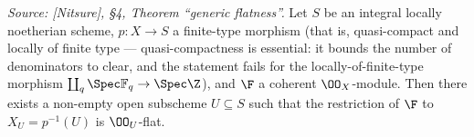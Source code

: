 \begin{theorem}
  \leanok
  \label{thm:generic_flatness}
  \textit{Source: [Nitsure], \S4, Theorem ``generic flatness''.}
  Let \(S\) be an integral locally noetherian scheme, \(p : X \to S\) a
  finite-type morphism (that is, quasi-compact and locally of finite type —
  quasi-compactness is essential: it bounds the number of denominators to
  clear, and the statement fails for the locally-of-finite-type morphism
  \(\coprod_q \Spec \mathbb{F}_q \to \Spec \Z\)), and \(\F\) a coherent
  \(\OO_X\)-module. Then there exists a non-empty open subscheme
  \(U \subseteq S\) such that the restriction of \(\F\) to
  \(X_U = p^{-1}(U)\) is \(\OO_U\)-flat.
\end{theorem}

